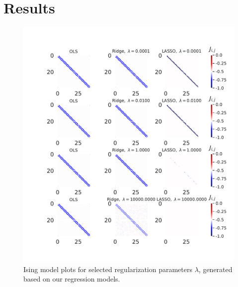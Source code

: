 \section{Results}
\begin{figure}[H]
\includegraphics[width = 0.7\paperwidth]{figures/regression_mehtastyle.pdf} 
\caption{Ising model plots for selected regularization parameters $\lambda$, generated based on our regression models.
	 } 
\label{fig:regression-mehta}
\end{figure}

